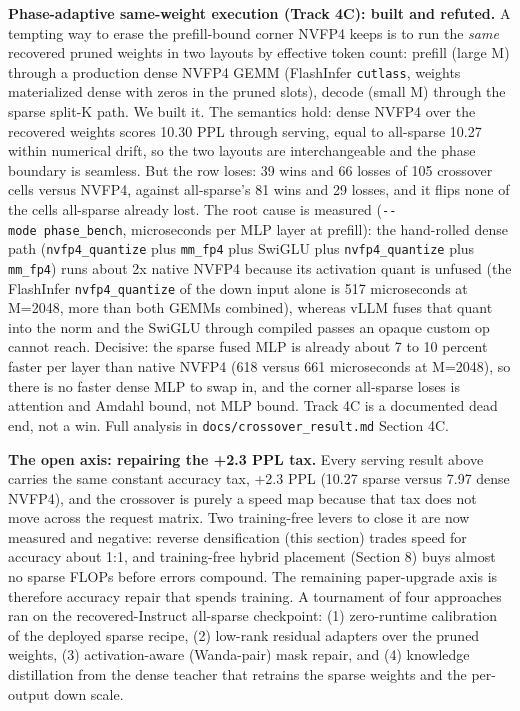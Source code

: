 \documentclass[
]{article}
\begin{document}
\textbf{Phase-adaptive same-weight execution (Track 4C): built and
refuted.} A tempting way to erase the prefill-bound corner NVFP4 keeps
is to run the \emph{same} recovered pruned weights in two layouts by
effective token count: prefill (large M) through a production dense
NVFP4 GEMM (FlashInfer \texttt{cutlass}, weights materialized dense with
zeros in the pruned slots), decode (small M) through the sparse split-K
path. We built it. The semantics hold: dense NVFP4 over the recovered
weights scores 10.30 PPL through serving, equal to all-sparse 10.27
within numerical drift, so the two layouts are interchangeable and the
phase boundary is seamless. But the row loses: 39 wins and 66 losses of
105 crossover cells versus NVFP4, against all-sparse's 81 wins and 29
losses, and it flips none of the cells all-sparse already lost. The root
cause is measured (\texttt{-\/-mode\ phase\_bench}, microseconds per MLP
layer at prefill): the hand-rolled dense path (\texttt{nvfp4\_quantize}
plus \texttt{mm\_fp4} plus SwiGLU plus \texttt{nvfp4\_quantize} plus
\texttt{mm\_fp4}) runs about 2x native NVFP4 because its activation
quant is unfused (the FlashInfer \texttt{nvfp4\_quantize} of the down
input alone is 517 microseconds at M=2048, more than both GEMMs
combined), whereas vLLM fuses that quant into the norm and the SwiGLU
through compiled passes an opaque custom op cannot reach. Decisive: the
sparse fused MLP is already about 7 to 10 percent faster per layer than
native NVFP4 (618 versus 661 microseconds at M=2048), so there is no
faster dense MLP to swap in, and the corner all-sparse loses is
attention and Amdahl bound, not MLP bound. Track 4C is a documented dead
end, not a win. Full analysis in \texttt{docs/crossover\_result.md}
Section 4C.

\textbf{The open axis: repairing the +2.3 PPL tax.} Every serving result
above carries the same constant accuracy tax, +2.3 PPL (10.27 sparse
versus 7.97 dense NVFP4), and the crossover is purely a speed map
because that tax does not move across the request matrix. Two
training-free levers to close it are now measured and negative: reverse
densification (this section) trades speed for accuracy about 1:1, and
training-free hybrid placement (Section 8) buys almost no sparse FLOPs
before errors compound. The remaining paper-upgrade axis is therefore
accuracy repair that spends training. A tournament of four approaches
ran on the recovered-Instruct all-sparse checkpoint: (1) zero-runtime
calibration of the deployed sparse recipe, (2) low-rank residual
adapters over the pruned weights, (3) activation-aware (Wanda-pair) mask
repair, and (4) knowledge distillation from the dense teacher that
retrains the sparse weights and the per-output down scale.
\end{document}
